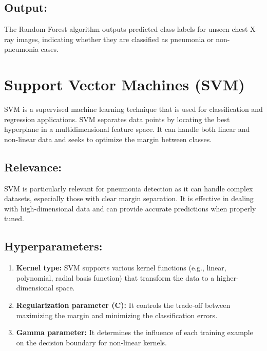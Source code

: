 \subsection{Output:}
The Random Forest algorithm outputs predicted class labels for unseen chest X-ray images, indicating whether they are classified as pneumonia or non-pneumonia cases.\\


\section{Support Vector Machines (SVM)}

\ac{SVM} is a supervised machine learning technique that is used for classification and regression applications. SVM separates data points by locating the best hyperplane in a multidimensional feature space. It can handle both linear and non-linear data and seeks to optimize the margin between classes.\autocite{cortes:2009}


\subsection{Relevance:}

SVM is particularly relevant for pneumonia detection as it can handle complex datasets, especially those with clear margin separation. It is effective in dealing with high-dimensional data and can provide accurate predictions when properly tuned.\\


\subsection{Hyperparameters:}

\begin{enumerate}
	\item \textbf{Kernel type:}  SVM supports various kernel functions (e.g., linear, polynomial, radial basis function) that transform the data to a higher-dimensional space.\\
	\item \textbf{Regularization parameter (C):} It controls the trade-off between maximizing the margin and minimizing the classification errors.\\
	\item \textbf{Gamma parameter:}  It determines the influence of each training example on the decision boundary for non-linear kernels.\\
\end{enumerate}

